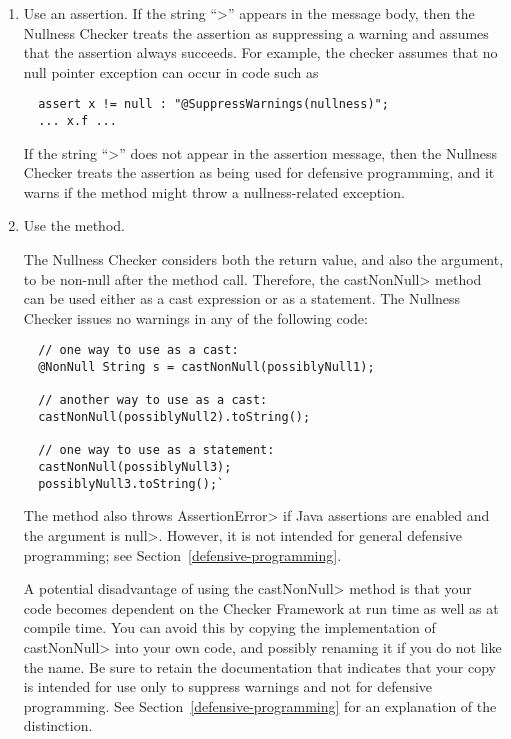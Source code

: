 \begin{enumerate}
\item
  Use an assertion.  If the string ``\<\nullnessSuppressionString>''
  appears in the message body, then the Nullness Checker treats the
  assertion as suppressing a warning and assumes that the assertion always
  succeeds.  For example, the checker assumes that no null pointer
  exception can occur in code such as
\begin{Verbatim}
  assert x != null : "@SuppressWarnings(nullness)";
  ... x.f ...
\end{Verbatim}

  If the string ``\<\nullnessSuppressionString>'' does not appear in the
  assertion message, then the Nullness Checker treats the assertion as being
  used for defensive programming, and it warns if the method might throw a
  nullness-related exception.


\item
  Use the  method.

The Nullness
 Checker considers both the return value, and also the argument, to
 be non-null after the method call.  Therefore, the
 \<castNonNull> method can be used either as a cast expression or
 as a statement.  The Nullness Checker issues no warnings in any of
the following code:

\begin{Verbatim}
  // one way to use as a cast:
  @NonNull String s = castNonNull(possiblyNull1);

  // another way to use as a cast:
  castNonNull(possiblyNull2).toString();

  // one way to use as a statement:
  castNonNull(possiblyNull3);
  possiblyNull3.toString();`
\end{Verbatim}

  The method also throws \<AssertionError> if Java assertions are enabled and
  the argument is \<null>.  However, it is not intended for general defensive
  programming; see Section~\ref{defensive-programming}.

  A potential disadvantage of using the \<castNonNull> method is that your
  code becomes dependent on the Checker Framework at run time as well as at
  compile time.  You can avoid this by copying the implementation of
  \<castNonNull> into your own code, and possibly renaming it if you do not
  like the name.  Be sure to retain the documentation that indicates that
  your copy is intended for use only to suppress warnings and not for
  defensive programming.  See Section~\ref{defensive-programming} for an
  explanation of the distinction.

\end{enumerate}


